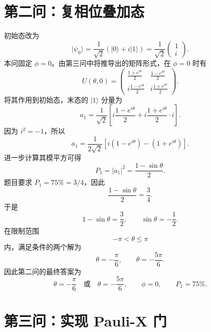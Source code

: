 \documentclass[UTF8]{ctexart}
\begin{document}
\section{第二问：复相位叠加态}

初始态改为
\[
|\psi_0\rangle
=\frac{1}{\sqrt{2}}\left(|0\rangle+i|1\rangle\right)
=\frac{1}{\sqrt{2}}
\begin{pmatrix}
1\\
i
\end{pmatrix}.
\]
本问固定 $\phi=0$。由第三问中将推导出的矩阵形式，在 $\phi=0$ 时有
\[
U(\theta,0)=
\begin{pmatrix}
\frac{1+e^{i\theta}}{2} & \frac{1-e^{i\theta}}{2}\\
i\frac{1-e^{i\theta}}{2} & i\frac{1+e^{i\theta}}{2}
\end{pmatrix}.
\]
将其作用到初始态，末态的 $|1\rangle$ 分量为
\[
a_1
=\frac{1}{\sqrt{2}}
\left[
i\frac{1-e^{i\theta}}{2}
+i\frac{1+e^{i\theta}}{2}\cdot i
\right].
\]
因为 $i^2=-1$，所以
\[
a_1
=\frac{1}{2\sqrt{2}}
\left[
i(1-e^{i\theta})-(1+e^{i\theta})
\right].
\]
进一步计算其模平方可得
\[
P_1=|a_1|^2
=\frac{1-\sin\theta}{2}.
\]
题目要求 $P_1=75\%=3/4$，因此
\[
\frac{1-\sin\theta}{2}=\frac{3}{4}.
\]
于是
\[
1-\sin\theta=\frac{3}{2},
\qquad
\sin\theta=-\frac{1}{2}.
\]
在限制范围
\[
-\pi<\theta\leq\pi
\]
内，满足条件的两个解为
\[
\theta=-\frac{\pi}{6},
\qquad
\theta=-\frac{5\pi}{6}.
\]
因此第二问的最终答案为
\[
\boxed{\theta=-\frac{\pi}{6}\quad \text{或}\quad \theta=-\frac{5\pi}{6},\qquad \phi=0,\qquad P_1=75\%.}
\]

\section{第三问：实现 Pauli-X 门}
\end{document}
